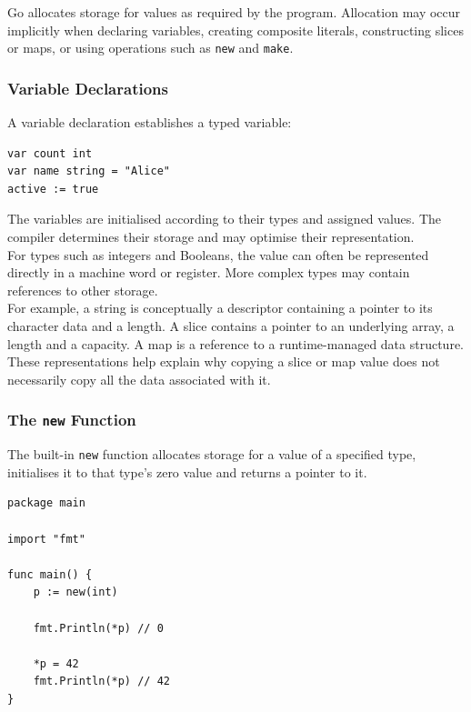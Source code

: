Go allocates storage for values as required by the program. Allocation may occur implicitly when declaring variables, creating composite literals, constructing slices or maps, or using operations such as \texttt{new} and \texttt{make}.

\subsubsection{Variable Declarations}

A variable declaration establishes a typed variable:

\begin{lstlisting}
var count int
var name string = "Alice"
active := true
\end{lstlisting}

The variables are initialised according to their types and assigned values. The compiler determines their storage and may optimise their representation.\\

For types such as integers and Booleans, the value can often be represented directly in a machine word or register. More complex types may contain references to other storage.\\

For example, a string is conceptually a descriptor containing a pointer to its character data and a length. A slice contains a pointer to an underlying array, a length and a capacity. A map is a reference to a runtime-managed data structure.\\

These representations help explain why copying a slice or map value does not necessarily copy all the data associated with it.

\subsubsection{The \texttt{new} Function}

The built-in \texttt{new} function allocates storage for a value of a specified type, initialises it to that type's zero value and returns a pointer to it.

\begin{lstlisting}
package main

import "fmt"

func main() {
    p := new(int)

    fmt.Println(*p) // 0

    *p = 42
    fmt.Println(*p) // 42
}
\end{lstlisting}

